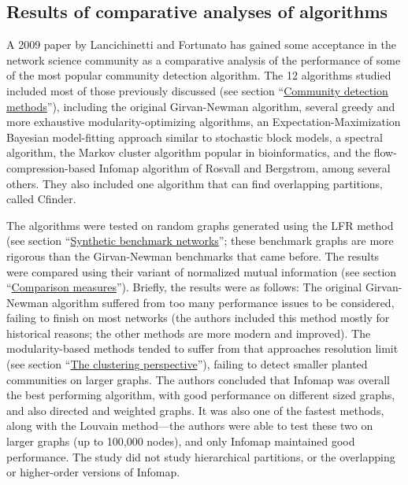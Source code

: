 

\subsection{Results of comparative analyses of
algorithms}\label{results-of-comparative-analyses-of-algorithms}

A 2009 paper by Lancichinetti and Fortunato
\autocite{lancichinetti_community_2009} has gained some acceptance in
the network science community as a comparative analysis of the
performance of some of the most popular community detection algorithm.
The 12 algorithms studied included most of those previously discussed
(see section ``\protect\hyperlink{community-detection-methods}{Community
detection methods}''), including the original Girvan-Newman algorithm,
several greedy and more exhaustive modularity-optimizing algorithms, an
Expectation-Maximization Bayesian model-fitting approach similar to
stochastic block models, a spectral algorithm, the Markov cluster
algorithm popular in bioinformatics, and the flow-compression-based
Infomap algorithm of Rosvall and Bergstrom, among several others. They
also included one algorithm that can find overlapping partitions, called
Cfinder.

The algorithms were tested on random graphs generated using the LFR
method (see section
``\protect\hyperlink{synthetic-benchmark-networks}{Synthetic benchmark
networks}''; these benchmark graphs are more rigorous than the
Girvan-Newman benchmarks that came before. The results were compared
using their variant of normalized mutual information (see section
``\protect\hyperlink{comparison-measures}{Comparison measures}'').
Briefly, the results were as follows: The original Girvan-Newman
algorithm suffered from too many performance issues to be considered,
failing to finish on most networks (the authors included this method
mostly for historical reasons; the other methods are more modern and
improved). The modularity-based methods tended to suffer from that
approaches resolution limit (see section
``\protect\hyperlink{the-clustering-perspective}{The clustering
perspective}''), failing to detect smaller planted communities on larger
graphs. The authors concluded that Infomap was overall the best
performing algorithm, with good performance on different sized graphs,
and also directed and weighted graphs. It was also one of the fastest
methods, along with the Louvain method---the authors were able to test
these two on larger graphs (up to 100,000 nodes), and only Infomap
maintained good performance. The study did not study hierarchical
partitions, or the overlapping or higher-order versions of Infomap.

